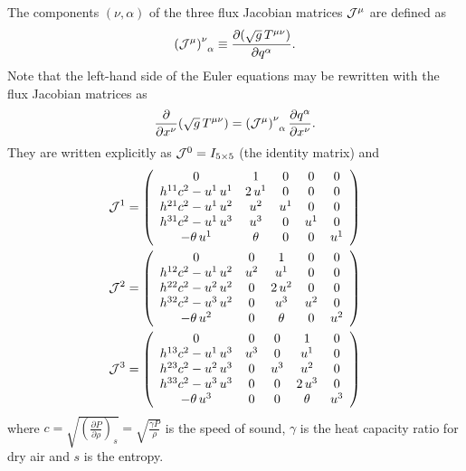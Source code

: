 \documentclass[12pt]{article}
\begin{document}
The components $(\nu,\alpha)$ of the three flux Jacobian matrices ${\cal J}^\mu$ are defined as
\begin{align}
\left( {\cal J}^\mu \right)^\nu_{\;\;\alpha}\equiv \frac{\partial (\sqrt{g}\,T^{\mu\nu})}{\partial q^\alpha}.
\end{align}
Note that the left-hand side of the Euler equations may be rewritten with the flux Jacobian matrices as
\begin{align}
\frac{\partial}{\partial x^\nu}(\sqrt{g}\,T^{\mu\nu})=\left( {\cal J}^\mu \right)^\nu_{\;\;\alpha} \frac{\partial q^\alpha}{\partial x^\nu}.
\end{align}
They are written explicitly as ${\cal J}^0=I_{5\times 5}$ (the identity matrix) and
\begin{align}
{\cal J}^1=\left(\begin{array}{ccccc} 0 & 1 & 0 & 0 & 0\\ h^{11} c^2 -u^{1}\,u^{1} & 2\,u^{1} & 0 & 0 & 0\\ h^{21} c^2 -u^{1}\,u^{2} & u^{2} & u^{1} & 0 & 0\\ h^{31} c^2 -u^{1}\,u^{3} & u^{3} & 0 & u^{1} & 0\\ -\theta \,u^{1} & \theta  & 0 & 0 & u^{1} \end{array}\right) \\
{\cal J}^2=\left(\begin{array}{ccccc} 0 & 0 & 1 & 0 & 0\\ h^{12} c^2-u^{1}\,u^{2} & u^{2} & u^{1} & 0 & 0\\ h^{22} c^2 - u^{2}\,u^{2} & 0 & 2\,u^{2} & 0 & 0\\ h^{32} c^2 - u^{3}\,u^{2} & 0 & u^{3} & u^{2} & 0\\ -\theta \,u^{2} & 0 & \theta  & 0 & u^{2} \end{array}\right)\\
{\cal J}^3=\left(\begin{array}{ccccc} 0 & 0 & 0 & 1 & 0\\ h^{13} c^2 -u^{1}\,u^{3} & u^{3} & 0 & u^{1} & 0\\ h^{23} c^2 -u^{2}\,u^{3} & 0 & u^{3} & u^{2} & 0\\ h^{33} c^2 - u^{3}\,u^{3} & 0 & 0 & 2\,u^{3} & 0\\ -\theta \,u^{3} & 0 & 0 & \theta  & u^{3} \end{array}\right)
\end{align}
where $c = \sqrt{\left(\frac{\partial P}{\partial\rho}\right)_s} = \sqrt{\frac{\gamma P}{\rho}}$ is the speed of sound, $\gamma$ is the heat capacity ratio for dry air and $s$ is the entropy.
\end{document}
